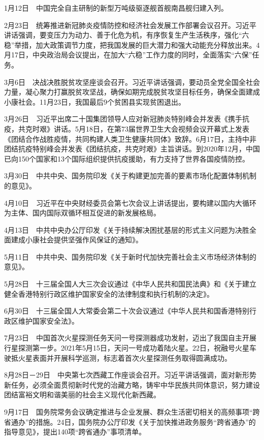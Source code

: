 \documentclass[10pt,a4paper,twocolumn]{book}
\begin{document}
1月12日　中国完全自主研制的新型万吨级驱逐舰首舰南昌舰归建入列。

2月23日　统筹推进新冠肺炎疫情防控和经济社会发展工作部署会议召开。习近平讲话强调，要变压力为动力、善于化危为机，有序恢复生产生活秩序，强化“六稳”举措，加大政策调节力度，把我国发展的巨大潜力和强大动能充分释放出来。4月17日，中央政治局会议提出，在加大“六稳”工作力度的同时，全面落实“六保”任务。

3月6日　决战决胜脱贫攻坚座谈会召开。习近平讲话强调，要动员全党全国全社会力量，凝心聚力打赢脱贫攻坚战，确保如期完成脱贫攻坚目标任务，确保全面建成小康社会。11月23日，我国最后9个贫困县实现贫困退出。

3月26日　习近平出席二十国集团领导人应对新冠肺炎特别峰会并发表《携手抗疫，共克时艰》讲话。5月18日，在第73届世界卫生大会视频会议开幕式上发表《团结合作战胜疫情，共同构建人类卫生健康共同体》致辞。6月17日，主持中非团结抗疫特别峰会并发表《团结抗疫，共克时艰》主旨讲话。到2020年12月，中国已向150个国家和13个国际组织提供抗疫援助，有力支持了世界各国疫情防控。

3月30日　中共中央、国务院印发《关于构建更加完善的要素市场化配置体制机制的意见》。

4月10日　习近平在中央财经委员会第七次会议上讲话提出，要构建以国内大循环为主体、国内国际双循环相互促进的新发展格局。

4月13日　中共中央办公厅印发《关于持续解决困扰基层的形式主义问题为决胜全面建成小康社会提供坚强作风保证的通知》。

5月11日　中共中央、国务院印发《关于新时代加快完善社会主义市场经济体制的意见》。

5月28日　十三届全国人大三次会议通过《中华人民共和国民法典》和《关于建立健全香港特别行政区维护国家安全的法律制度和执行机制的决定》。

6月30日　十三届全国人大常委会第二十次会议通过《中华人民共和国香港特别行政区维护国家安全法》。

7月23日　中国首次火星探测任务天问一号探测器成功发射，迈出了我国自主开展行星探测第一步。2021年5月15日，天问一号成功着陆火星。22日，祝融号火星车驶抵火星表面并开展科学巡测，标志着首次火星探测任务取得圆满成功。

8月28日－29日　中央第七次西藏工作座谈会召开。习近平讲话强调，面对新形势新任务，必须全面贯彻新时代党的治藏方略，铸牢中华民族共同体意识，努力建设团结富裕文明和谐美丽的社会主义现代化新西藏。

9月17日　国务院常务会议确定推进与企业发展、群众生活密切相关的高频事项“跨省通办”的措施。24日，国务院办公厅印发《关于加快推进政务服务“跨省通办”的指导意见》，提出140项“跨省通办”事项清单。
\end{document}
